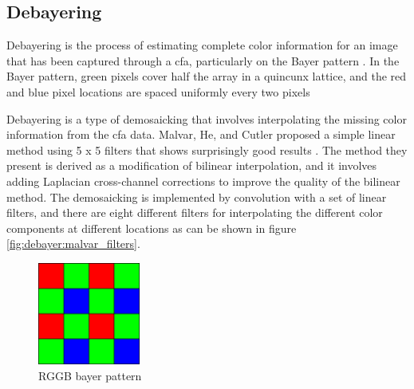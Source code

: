 \subsection{Debayering}
Debayering is the process of estimating complete color information for an image that has been captured through a \gls{cfa}, particularly on the Bayer pattern \cite{getreuerMalvarHeCutlerLinearImage2011}.
In the Bayer pattern, green pixels cover half the array in a quincunx lattice, and the red and blue pixel locations are spaced uniformly every two pixels \cite{getreuerMalvarHeCutlerLinearImage2011}

Debayering is a type of demosaicking that involves interpolating the missing color information from the \gls{cfa} data.
Malvar, He, and Cutler proposed a simple linear method using 5 x 5 filters that shows surprisingly good results \cite{getreuerMalvarHeCutlerLinearImage2011}.
The method they present is derived as a modification of bilinear interpolation, and it involves adding Laplacian cross-channel corrections to improve the quality of the bilinear method.
The demosaicking is implemented by convolution with a set of linear filters, and there are eight different filters for interpolating the different color components at different locations as can be shown in figure \ref{fig:debayer:malvar_filters}.

\begin{figure}
    \centering
    \includegraphics[width=0.3\textwidth]{figures/debayer/bayer_pattern.pdf}
    \caption{RGGB bayer pattern\cite{CommonsBayerPattern2020}}
\end{figure}

